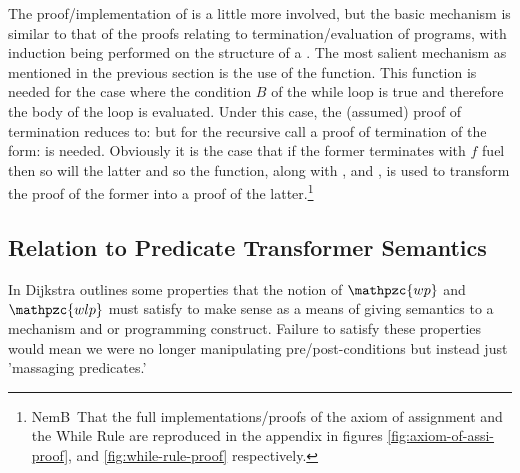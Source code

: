 \documentclass[oneside,12pt]{article}
\newcommand\NB[1][0.1]{N\kern-#1emB \,} %
\newcommand{\textM}[1]{\ensuremath{\mathpzc{#1}}}
\begin{document}
The proof/implementation of  is a little more involved, but the basic mechanism is similar to that of the proofs relating to termination/evaluation of programs, with induction being performed on the structure of a . The most salient mechanism as mentioned in the previous section is the use of the \mbox{} function. This function is needed for the case where the condition $B$ of the while loop is true and therefore the body of the loop is evaluated. Under this case, the (assumed) proof of termination reduces to: \mbox{\AgdaSpace{}\AgdaSpace{}\AgdaSpace{}\AgdaSymbol{(}\AgdaSpace{}\AgdaSpace{}\AgdaSpace{}\AgdaSpace{}\AgdaSpace{}\AgdaSpace{}\AgdaSymbol{)}\AgdaSpace{}\AgdaSpace{}\AgdaSpace{}} but for the recursive call a proof of termination of the form: \mbox{\AgdaSpace{}\AgdaSpace{}\AgdaSpace{}\AgdaSymbol{(}\AgdaSpace{}\AgdaSpace{}\AgdaSpace{}\AgdaSpace{}\AgdaSymbol{)}\AgdaSpace{}\AgdaSpace{}\AgdaSpace{}} is needed. Obviously it is the case that if the former terminates with $f$ fuel then so will the latter and so the \mbox{} function, along with \mbox{}, and \mbox{}, is used to transform the proof of the former into a proof of the latter.\footnote{ \NB That the full implementations/proofs of the axiom of assignment and the While Rule are reproduced in the appendix in figures \ref{fig:axiom-of-assi-proof}, and \ref{fig:while-rule-proof} respectively.}




\subsection{Relation to Predicate Transformer Semantics}

In \cite{Dijkstra76} Dijkstra outlines some properties that the notion of \textM{wp} and \textM{wlp} must satisfy to make sense as a means of giving semantics to a mechanism and or programming construct. Failure to satisfy these properties would mean we were no longer manipulating pre/post-conditions but instead just 'massaging predicates.'
\end{document}
